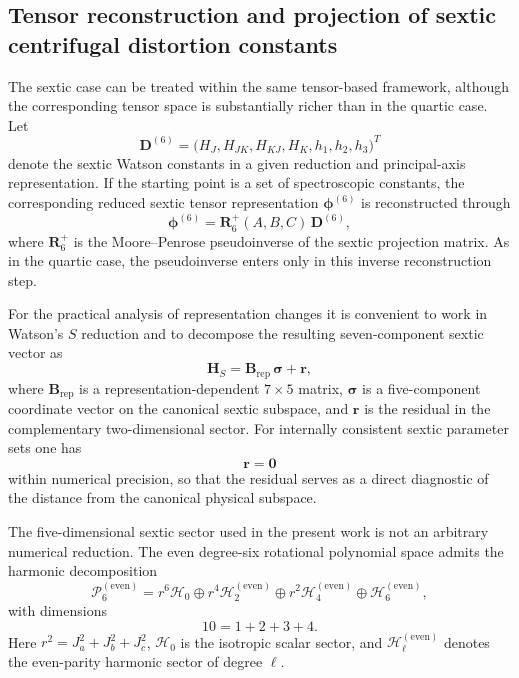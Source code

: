 \subsection{Tensor reconstruction and projection of sextic centrifugal distortion constants}

The sextic case can be treated within the same tensor-based framework,
although the corresponding tensor space is substantially richer than in the
quartic case.  Let
\[
\mathbf D^{(6)} =
\bigl(
H_J,H_{JK},H_{KJ},H_K,h_1,h_2,h_3
\bigr)^T
\]
denote the sextic Watson constants in a given reduction and principal-axis
representation.  If the starting point is a set of spectroscopic constants, the
corresponding reduced sextic tensor representation
$\boldsymbol\phi^{(6)}$ is reconstructed through
\begin{equation}
\boldsymbol\phi^{(6)}=
\mathbf R_6^{+}(A,B,C)\,\mathbf D^{(6)},
\label{eq:sextic_pseudoinverse}
\end{equation}
where $\mathbf R_6^{+}$ is the Moore--Penrose pseudoinverse of the sextic
projection matrix.  As in the quartic case, the pseudoinverse enters only in
this inverse reconstruction step.

For the practical analysis of representation changes it is convenient to work
in Watson's $S$ reduction and to decompose the resulting seven-component sextic
vector as
\begin{equation}
\mathbf H_S = \mathbf B_{\mathrm{rep}}\,\boldsymbol\sigma + \mathbf r,
\label{eq:sextic_5plus2}
\end{equation}
where $\mathbf B_{\mathrm{rep}}$ is a representation-dependent $7\times 5$
matrix, $\boldsymbol\sigma$ is a five-component coordinate vector on the
canonical sextic subspace, and $\mathbf r$ is the residual in the complementary
two-dimensional sector.  For internally consistent sextic parameter sets one
has
\begin{equation}
\mathbf r=\mathbf 0
\end{equation}
within numerical precision, so that the residual serves as a direct
diagnostic of the distance from the canonical physical subspace.

The five-dimensional sextic sector used in the present work is not an
arbitrary numerical reduction.  The even degree-six rotational polynomial space
admits the harmonic decomposition
\begin{equation}
\mathcal P_6^{(\mathrm{even})}
=
r^6\mathcal H_0
\oplus
r^4\mathcal H_2^{(\mathrm{even})}
\oplus
r^2\mathcal H_4^{(\mathrm{even})}
\oplus
\mathcal H_6^{(\mathrm{even})},
\label{eq:sextic_harmonic_decomp}
\end{equation}
with dimensions
\[
10 = 1 + 2 + 3 + 4.
\]
Here $r^2=J_a^2+J_b^2+J_c^2$, $\mathcal H_0$ is the isotropic scalar sector,
and $\mathcal H_\ell^{(\mathrm{even})}$ denotes the even-parity harmonic sector
of degree $\ell$.

